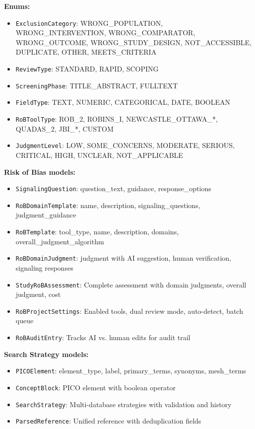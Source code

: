 \documentclass[11pt,a4paper]{article}
\begin{document}
\textbf{Enums:}
\begin{itemize}[nosep]
  \item \texttt{ExclusionCategory}: WRONG\_POPULATION, WRONG\_INTERVENTION, WRONG\_COMPARATOR, WRONG\_OUTCOME, WRONG\_STUDY\_DESIGN, NOT\_ACCESSIBLE, DUPLICATE, OTHER, MEETS\_CRITERIA
  \item \texttt{ReviewType}: STANDARD, RAPID, SCOPING
  \item \texttt{ScreeningPhase}: TITLE\_ABSTRACT, FULLTEXT
  \item \texttt{FieldType}: TEXT, NUMERIC, CATEGORICAL, DATE, BOOLEAN
  \item \texttt{RoBToolType}: ROB\_2, ROBINS\_I, NEWCASTLE\_OTTAWA\_*, QUADAS\_2, JBI\_*, CUSTOM
  \item \texttt{JudgmentLevel}: LOW, SOME\_CONCERNS, MODERATE, SERIOUS, CRITICAL, HIGH, UNCLEAR, NOT\_APPLICABLE
\end{itemize}

\textbf{Risk of Bias models:}
\begin{itemize}[nosep]
  \item \texttt{SignalingQuestion}: question\_text, guidance, response\_options
  \item \texttt{RoBDomainTemplate}: name, description, signaling\_questions, judgment\_guidance
  \item \texttt{RoBTemplate}: tool\_type, name, description, domains, overall\_judgment\_algorithm
  \item \texttt{RoBDomainJudgment}: judgment with AI suggestion, human verification, signaling responses
  \item \texttt{StudyRoBAssessment}: Complete assessment with domain judgments, overall judgment, cost
  \item \texttt{RoBProjectSettings}: Enabled tools, dual review mode, auto-detect, batch queue
  \item \texttt{RoBAuditEntry}: Tracks AI vs. human edits for audit trail
\end{itemize}

\textbf{Search Strategy models:}
\begin{itemize}[nosep]
  \item \texttt{PICOElement}: element\_type, label, primary\_terms, synonyms, mesh\_terms
  \item \texttt{ConceptBlock}: PICO element with boolean operator
  \item \texttt{SearchStrategy}: Multi-database strategies with validation and history
  \item \texttt{ParsedReference}: Unified reference with deduplication fields
\end{itemize}
\end{document}
